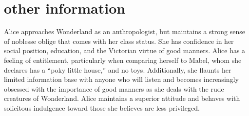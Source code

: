 \documentclass[icon]{twentysecondcv}
\begin{document}
\section{other information}
Alice approaches Wonderland as an anthropologist, but maintains a strong sense of noblesse oblige that comes with her class status. She has confidence in her social position, education, and the Victorian virtue of good manners. Alice has a feeling of entitlement, particularly when comparing herself to Mabel, whom she declares has a “poky little house,” and no toys. Additionally, she flaunts her limited information base with anyone who will listen and becomes increasingly obsessed with the importance of good manners as she deals with the rude creatures of Wonderland. Alice maintains a superior attitude and behaves with solicitous indulgence toward those she believes are less privileged.

\end{document}
